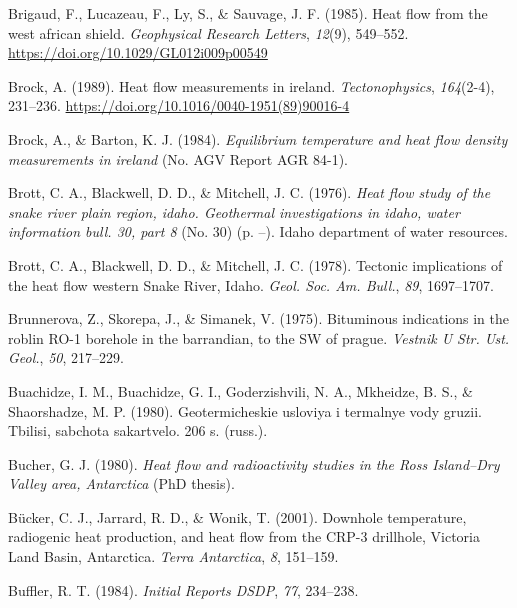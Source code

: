 \begin{CSLReferences}{1}{1}
\leavevmode{}%
Brigaud, F., Lucazeau, F., Ly, S., \& Sauvage, J. F. (1985). Heat flow from the west african shield. \emph{Geophysical Research Letters}, \emph{12}(9), 549--552. \url{https://doi.org/10.1029/GL012i009p00549}

\leavevmode{}%
Brock, A. (1989). Heat flow measurements in ireland. \emph{Tectonophysics}, \emph{164}(2-4), 231--236. \url{https://doi.org/10.1016/0040-1951(89)90016-4}

\leavevmode{}%
Brock, A., \& Barton, K. J. (1984). \emph{Equilibrium temperature and heat flow density measurements in ireland} (No. AGV Report AGR 84-1).

\leavevmode{}%
Brott, C. A., Blackwell, D. D., \& Mitchell, J. C. (1976). \emph{Heat flow study of the snake river plain region, idaho. Geothermal investigations in idaho, water information bull. 30, part 8} (No. 30) (p. --). Idaho department of water resources.

\leavevmode{}%
Brott, C. A., Blackwell, D. D., \& Mitchell, J. C. (1978). Tectonic implications of the heat flow western {Snake River, Idaho}. \emph{Geol. Soc. Am. Bull.}, \emph{89}, 1697--1707.

\leavevmode{}%
Brunnerova, Z., Skorepa, J., \& Simanek, V. (1975). Bituminous indications in the roblin RO-1 borehole in the barrandian, to the SW of prague. \emph{Vestnik U Str. Ust. Geol.}, \emph{50}, 217--229.

\leavevmode{}%
Buachidze, I. M., Buachidze, G. I., Goderzishvili, N. A., Mkheidze, B. S., \& Shaorshadze, M. P. (1980). Geotermicheskie usloviya i termalnye vody gruzii. Tbilisi, sabchota sakartvelo. 206 s. (russ.).

\leavevmode{}%
Bucher, G. J. (1980). \emph{Heat flow and radioactivity studies in the {Ross Island--Dry Valley} area, {Antarctica}} (PhD thesis).

\leavevmode{}%
Bücker, C. J., Jarrard, R. D., \& Wonik, T. (2001). Downhole temperature, radiogenic heat production, and heat flow from the {CRP-3} drillhole, {Victoria Land Basin, Antarctica}. \emph{Terra Antarctica}, \emph{8}, 151--159.

\leavevmode{}%
Buffler, R. T. (1984). \emph{Initial Reports DSDP}, \emph{77}, 234--238.


\end{CSLReferences}
